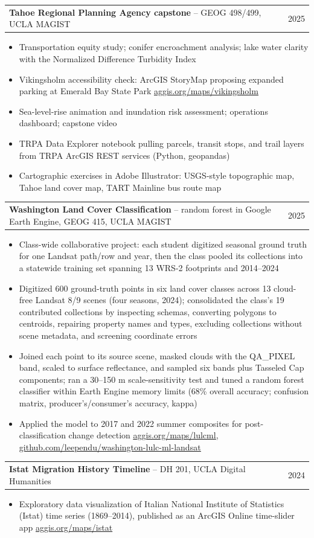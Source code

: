 \documentclass[letterpaper,10pt]{article}
\makeatletter
\newlength{\entrygap}   \setlength{\entrygap}{1pt}   %
\newlength{\bulletgap}  \setlength{\bulletgap}{0pt}  %
\newlength{\groupindent}\setlength{\groupindent}{0.15in} %
\newcommand{\resumeItem}[1]{\item \small{#1}}
\newif\ifresumecont \resumecontfalse
\newcommand{\resumeProjectHeading}[2]{%
  \vspace{\entrygap}\item
    \begin{tabular*}{0.97\textwidth}[t]{l@{\extracolsep{\fill}}r}
      \small#1 & \small#2 \\
    \end{tabular*}%
}
\newcommand{\resumeItemListStart}{%
  \begin{itemize}[leftmargin=\groupindent, itemsep=\bulletgap,
                  parsep=0pt, topsep=1pt, partopsep=0pt]}
\newcommand{\resumeItemListEnd}{\resumecontfalse\end{itemize}}
\newcommand{\lnk}[2]{{\scriptsize\href{#1}{\underline{#2}}}}
\makeatother
\begin{document}
    \resumeProjectHeading
      {\textbf{Tahoe Regional Planning Agency capstone} -- GEOG 498/499, UCLA MAGIST}{2025}
      \resumeItemListStart
        \resumeItem{Transportation equity study; conifer encroachment analysis; lake water clarity with the Normalized Difference Turbidity Index}
        \resumeItem{Vikingsholm accessibility check: ArcGIS StoryMap proposing expanded parking at Emerald Bay State Park \lnk{https://aggis.org/maps/vikingsholm/}{aggis.org/maps/vikingsholm}}
        \resumeItem{Sea-level-rise animation and inundation risk assessment; operations dashboard; capstone video}
        \resumeItem{TRPA Data Explorer notebook pulling parcels, transit stops, and trail layers from TRPA ArcGIS REST services (Python, geopandas)}
        \resumeItem{Cartographic exercises in Adobe Illustrator: USGS-style topographic map, Tahoe land cover map, TART Mainline bus route map}
      \resumeItemListEnd

    \resumeProjectHeading
      {\textbf{Washington Land Cover Classification} -- random forest in Google Earth Engine, GEOG 415, UCLA MAGIST}{2025}
      \resumeItemListStart
        \resumeItem{Class-wide collaborative project: each student digitized seasonal ground truth for one Landsat path/row and year, then the class pooled its collections into a statewide training set spanning 13 WRS-2 footprints and 2014--2024}
        \resumeItem{Digitized 600 ground-truth points in six land cover classes across 13 cloud-free Landsat 8/9 scenes (four seasons, 2024); consolidated the class's 19 contributed collections by inspecting schemas, converting polygons to centroids, repairing property names and types, excluding collections without scene metadata, and screening coordinate errors}
        \resumeItem{Joined each point to its source scene, masked clouds with the QA\_PIXEL band, scaled to surface reflectance, and sampled six bands plus Tasseled Cap components; ran a 30--150 m scale-sensitivity test and tuned a random forest classifier within Earth Engine memory limits (68\% overall accuracy; confusion matrix, producer's/consumer's accuracy, kappa)}
        \resumeItem{Applied the model to 2017 and 2022 summer composites for post-classification change detection \lnk{https://aggis.org/maps/lulcml/}{aggis.org/maps/lulcml}, \lnk{https://github.com/leependu/washington-lulc-ml-landsat}{github.com/leependu/washington-lulc-ml-landsat}}
      \resumeItemListEnd

    \resumeProjectHeading
      {\textbf{Istat Migration History Timeline} -- DH 201, UCLA Digital Humanities}{2024}
      \resumeItemListStart
        \resumeItem{Exploratory data visualization of Italian National Institute of Statistics (Istat) time series (1869--2014), published as an ArcGIS Online time-slider app \lnk{https://aggis.org/maps/istat/}{aggis.org/maps/istat}}
      \resumeItemListEnd
\end{document}
